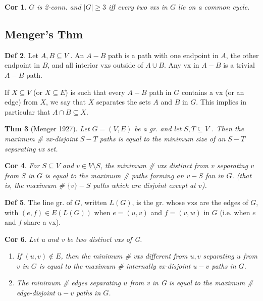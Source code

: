 \documentclass[11pt, fleqn, a4paper, landscape]{article}
\theoremstyle{plain} %
\newtheorem{thm}{Thm}
\newtheorem{cor}[thm]{Cor}
\theoremstyle{remark} %
\theoremstyle{definition} %
\newtheorem{defi}[thm]{Def}
\begin{document}
\begin{multicols}{5}
\begin{cor}
$G$ is 2-conn. and $|G|\ge 3$ iff every two vxs in $G$ lie on a common cycle.
\end{cor}
\subsection{Menger’s Thm}

\begin{defi}
Let $A,B \subseteq V$ . An $A-B$ path is a path with one endpoint in $A$, the other endpoint in $B$, and all interior vxs outside of $A \cup B$. Any vx in $A - B$ is a trivial $A-B$ path.

If $X \subseteq V$ (or $X \subseteq E$) is such that every $A-B$ path in $G$ contains a vx (or an edge) from $X$, we say that $X$ separates the sets $A$ and $B$ in $G$. This implies in particular that $A \cap B \subseteq X$.
\end{defi}
\begin{thm}[Menger 1927]
Let $G = (V,E)$ be a gr. and let $S, T \subseteq V$ . Then the maximum
\# vx-disjoint $S-T$ paths is equal to the minimum size of an $S-T$ separating vx set.
\end{thm}

\begin{cor}
For $S \subseteq V$ and $v\in V \setminus S$, the minimum \# vxs distinct from $v$ separating $v$ from $S$ in $G$ is equal to the maximum \# paths forming an $v-S$ fan in $G$. (that is, the maximum \# $\{v\}-S$ paths which are disjoint except at $v$).
\end{cor}

\begin{defi}
The line gr. of $G$, written $L(G)$, is the gr. whose vxs are the edges of $G$, with $(e, f) \in E(L(G))$ when $e = (u, v)$ and $f = (v,w)$ in $G$ (i.e. when $e$ and $f$ share a vx).
\end{defi}
\addtocounter{thm}{1}
\begin{cor}
Let u and v be two distinct vxs of G.
\begin{enumerate}
\item If $(u, v) \notin E$, then the minimum \# vxs different from $u, v$ separating $u$ from $v$ in $G$ is equal to the maximum \# internally vx-disjoint $u-v$ paths in $G$.
\item The minimum \# edges separating $u$ from v in G is equal to the maximum \# edge-disjoint $u-v$ paths in $G$.
\end{enumerate}
\end{cor}


\end{multicols}
\end{document}
